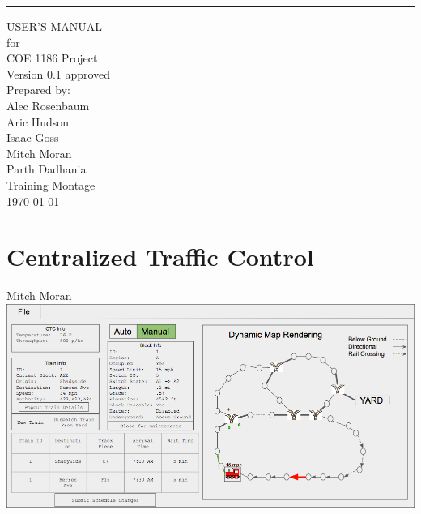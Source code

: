 \documentclass{scrreprt}
\date{}
\def\myversion{0.1 }
\begin{document}
\begin{flushright}
    \rule{16cm}{5pt}\vskip1cm
    \begin{bfseries}
        \Huge{USER'S MANUAL}\\
        \vspace{.9cm}
        for\\
        \vspace{.9cm}
        COE 1186 Project\\
        \vspace{.9cm}
        \LARGE{Version \myversion approved}\\
        \vspace{.9cm}
        Prepared by:\\
        Alec Rosenbaum\\
        Aric Hudson\\
        Isaac Goss\\
        Mitch Moran\\
        Parth Dadhania\\
        \vspace{1.9cm}
        Training Montage\\
        \vspace{.9cm}
        \today\\
    \end{bfseries}
\end{flushright}

\tableofcontents


\chapter{Centralized Traffic Control}
\Large{Mitch Moran}\\

\includegraphics[width=\textwidth]{CTC-main}
\end{document}
